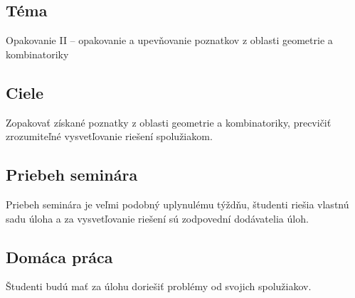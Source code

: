 

\subsection*{Téma}
Opakovanie II -- opakovanie a upevňovanie poznatkov z oblasti geometrie a kombinatoriky

\subsection*{Ciele}
Zopakovať získané poznatky z oblasti geometrie a kombinatoriky, precvičiť zrozumiteľné vysvetľovanie riešení spolužiakom.

\subsection*{Priebeh seminára}
Priebeh seminára je veľmi podobný uplynulému týždňu, študenti riešia vlastnú sadu úloha a za vysvetľovanie riešení sú zodpovední dodávatelia úloh.

\subsection*{Domáca práca}
Študenti budú mať za úlohu doriešiť problémy od svojich spolužiakov.

